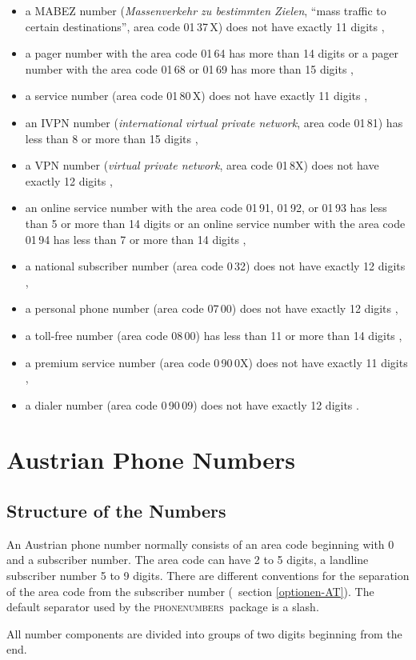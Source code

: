 \documentclass[numbers=noenddot]{scrreprt}
\newcommand\Abschnittsliteratur[1]{\bgroup
\small
\raggedright
\printbibliography[heading=subbibnumbered,keyword=#1]
\egroup}
\newcommand*\Paket[1]{\textsc{#1}}
\newcommand\phone{\textcolor{cnltx}{\Paket{phone\-numbers}}}
\newcommand\UeberschriftAufbau{\section{Structure of the Numbers}}
\newcommand*\vglAbschnitt[1]{(\cf\ section \ref{#1})}
\newcommand*\AufbauDEATA[6]{ #1 phone number normally consists of an area code beginning with 0 and a subscriber number. The area code can have #2 to #3 digits, a landline subscriber number #4 to #5 digits. There are different conventions for the separation of the area code from the subscriber number
\vglAbschnitt{#6}.
The default separator used by the \phone\ package is a slash.}
\begin{document}
\begin{itemize}
\item a MABEZ number (\emph{Massenverkehr zu bestimmten Zielen}, \enquote{mass traffic to certain destinations}, area code 01\,37\,X) does not have exactly 11 digits \cite[2]{BNA-mabez},
\item a pager number with the area code 01\,64 has more than 14 digits or a pager number with the area code 01\,68 or 01\,69 has more than 15 digits \cite[2]{BNA-nummernplan},
\item a service number (area code 01\,80\,X) does not have exactly 11 digits \cite[71]{BNA-konzept},
\item an IVPN number (\emph{international virtual private network}, area code 01\,81) has less than 8 or more than 15 digits \cite[55]{BNA-konzept},
\item a VPN number (\emph{virtual private network}, area code 01\,8X) does not have exactly 12 digits \cite[53]{BNA-konzept},
\item an online service number with the area code 01\,91, 01\,92, or 01\,93 has less than 5 or more than 14 digits or an online service number with the area code 01\,94 has less than 7 or more than 14 digits \cite[\ppno\ 1 and 4]{BNA-019},
\item a national subscriber number (area code 0\,32) does not have exactly 12 digits \cite[45]{BNA-konzept},
\item a personal phone number (area code 07\,00) does not have exactly 12 digits \cite[74]{BNA-konzept},
\item a toll-free number (area code 08\,00) has less than 11 or more than 14 digits \cite[\ppno\ 1 and 5\psq]{BNA-0800},
\item a premium service number (area code 0\,90\,0X) does not have exactly 11 digits \cite[76]{BNA-konzept},
\item a dialer number (area code 0\,90\,09) does not have exactly 12 digits \cite[78]{BNA-konzept}.
\end{itemize}

\Abschnittsliteratur{german}

\chapter{Austrian Phone Numbers}
\UeberschriftAufbau
\AufbauDEATA{An Austrian}{2}{5}{5}{9}{optionen-AT}

All number components are divided into groups of two digits beginning from the end.
\begin{sidebyside}
\end{sidebyside}
\end{document}
